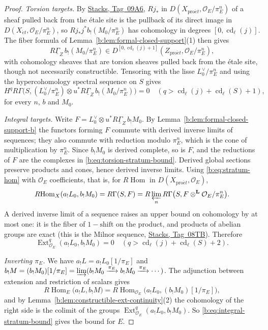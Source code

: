 \documentclass[11pt,a4paper]{article}
\numberwithin{equation}{section}
\theoremstyle{definition}
\theoremstyle{remark}
\newcommand{\D}{D}
\newcommand{\RHom}{R\!\operatorname{Hom}}
\newcommand{\et}{\acute{e}t}
\newcommand{\proet}{\mathrm{pro}\acute{e}t}
\newcommand{\stacks}[1]{\href{https://stacks.math.columbia.edu/tag/#1}{\textnormal{Stacks, Tag~#1}}}
\newcommand{\Ext}{\operatorname{Ext}}
\begin{document}
\begin{proof}
\emph{Torsion targets.} By \stacks{09A6}, $Rj_*$ in
$\D(X_{\proet},\mathcal O_E/\pi_E^n)$ of a sheaf pulled back from the
\'etale site is the pullback of its direct image in
$\D(X_{\et},\mathcal O_E/\pi_E^n)$, so
$Rj_*j^*b_!(M_0/\pi_E^n)$ has cohomology in degrees
$[0,\operatorname{cd}_\ell(j)]$. The fiber formula of
Lemma~\ref{b:lem:formal-closed-support}(1) then gives
\[
 R\underline\Gamma_Z\,b_!(M_0/\pi_E^n)\in\D^{[0,\operatorname{cd}_\ell(j)+1]}(Z_{\proet},\mathcal O_E/\pi_E^n),
\]
with cohomology sheaves that are torsion sheaves pulled back from the
\'etale site, though not necessarily constructible. Tensoring with the
lisse $L_0^\vee/\pi_E^n$ and using the hypercohomology spectral sequence
on $S$ gives
\begin{equation}\label{b:eq:torsion-stratum-bound}
 H^q R\Gamma\bigl(S,(L_0^\vee/\pi_E^n)\otimes u^*R\underline\Gamma_Z\,b_!(M_0/\pi_E^n)\bigr)=0
 \quad(q>\operatorname{cd}_\ell(j)+\operatorname{cd}_\ell(S)+1),
\end{equation}
for every $n$, $b$ and $M_0$.

\emph{Integral targets.} Write $F=L_0^\vee\otimes u^*R\underline\Gamma_Z\,b_!M_0$.
By Lemma~\ref{b:lem:formal-closed-support-b} the functors forming $F$
commute with derived inverse limits of sequences; they also commute with
reduction modulo $\pi_E^n$, which is the cone of multiplication by
$\pi_E^n$. Since $b_!M_0$ is derived complete, so is $F$, and the
reductions of $F$ are the complexes in \eqref{b:eq:torsion-stratum-bound}.
Derived global sections preserve products and cones, hence derived
inverse limits. Using \eqref{b:eq:stratum-hom} with $\mathcal O_E$
coefficients, that is, for $\RHom$ in $\D(X_{\proet},\mathcal O_E)$,
\[
 \RHom_X(a_!L_0,b_!M_0)
 =R\Gamma(S,F)
 =R\varprojlim_n R\Gamma\bigl(S,F\otimes^{\mathbf L}\mathcal O_E/\pi_E^n\bigr).
\]
A derived inverse limit of a sequence raises an upper bound on cohomology
by at most one: it is the fiber of $1-\mathrm{shift}$ on the product, and
products of abelian groups are exact (this is the Milnor sequence,
\stacks{08TB}). Therefore
\begin{equation}\label{b:eq:integral-stratum-bound}
 \Ext^q_{\mathcal O_E}(a_!L_0,b_!M_0)=0
 \quad(q>\operatorname{cd}_\ell(j)+\operatorname{cd}_\ell(S)+2).
\end{equation}

\emph{Inverting $\pi_E$.} We have $a_!L=a_!L_0[1/\pi_E]$ and
$b_!M=(b_!M_0)[1/\pi_E]=\varinjlim(b_!M_0\xrightarrow{\pi_E}b_!M_0\xrightarrow{\pi_E}\cdots)$.
The adjunction between extension and restriction of scalars gives
\[
 \RHom_E\bigl(a_!L,b_!M\bigr)
 =\RHom_{\mathcal O_E}\bigl(a_!L_0,(b_!M_0)[1/\pi_E]\bigr),
\]
and by Lemma~\ref{b:lem:constructible-ext-continuity}(2) the cohomology of
the right side is the colimit of the groups
$\Ext^q_{\mathcal O_E}(a_!L_0,b_!M_0)$. So
\eqref{b:eq:integral-stratum-bound} gives the bound for $E$.


\end{proof}
\end{document}
